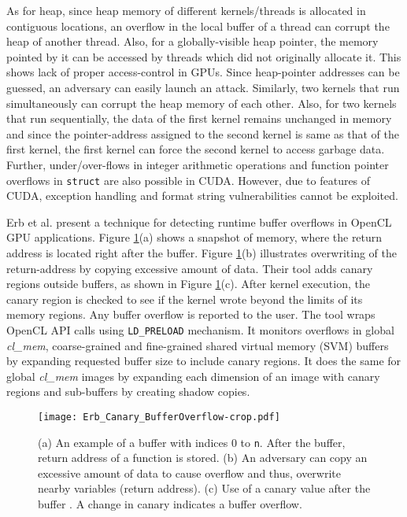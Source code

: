 As for heap,  since heap memory of different kernels/threads is allocated in contiguous locations, an overflow in the local buffer of a thread can corrupt the heap of another thread. Also, for a globally-visible heap pointer, the memory pointed by it can be accessed by threads which did not originally allocate it. This shows lack of proper access-control in GPUs. Since heap-pointer addresses can be guessed, an adversary can easily launch an attack. Similarly, two kernels that run simultaneously can corrupt the heap memory of each other. Also, for two kernels that run sequentially,  the data of the first kernel remains unchanged in memory and since the pointer-address assigned to the second kernel is same as that of the first kernel, the first kernel can force the second kernel to access garbage data. Further, under/over-flows in integer arithmetic operations and function pointer overflows in {\tt struct} are also possible in CUDA. However, due to features of CUDA, exception handling and format string vulnerabilities cannot be exploited.
 
 

 
Erb et al. \cite{erb2017dynamic} present a technique for detecting runtime buffer overflows in OpenCL GPU applications. Figure \ref{fig:BufferOverflow}(a) shows a snapshot of memory, where the return address is located right after the buffer. Figure \ref{fig:BufferOverflow}(b) illustrates overwriting of the return-address by copying excessive amount of data. Their tool adds canary regions outside buffers, as shown in Figure \ref{fig:BufferOverflow}(c). After kernel execution, the canary region is checked to see if the kernel wrote beyond the limits of its memory regions. Any buffer overflow is reported to the user. The tool wraps OpenCL API calls using {\tt LD\_PRELOAD} mechanism. It monitors overflows in global \textit{cl\_mem}, coarse-grained and fine-grained shared virtual memory (SVM) buffers by expanding requested buffer size to include canary regions. It does the same for global \textit{cl\_mem} images by expanding each dimension of an image with canary regions and sub-buffers by creating shadow copies.

 
\begin{figure} [htbp]
\centering
\texttt{[image: Erb\_Canary\_BufferOverflow-crop.pdf]}
\caption{ (a) An example of a buffer with indices 0 to {\tt n}. After the buffer, return address of a function is stored. (b) An adversary can copy an excessive amount of data to cause overflow and thus, overwrite nearby variables (return address). (c) Use of a canary value after the buffer \cite{erb2017dynamic}. A change in canary indicates a buffer overflow. }\label{fig:BufferOverflow}
\end{figure}


